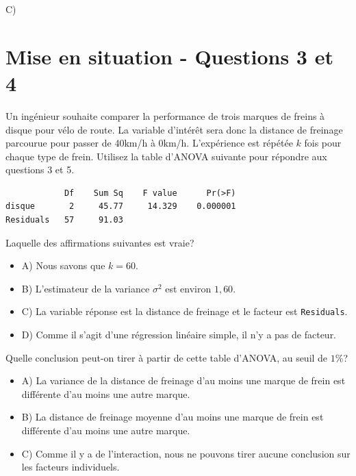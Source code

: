 \begin{questions}
\begin{solution}
C)
\end{solution}


\newpage
\section*{Mise en situation - Questions 3 et 4}
Un ingénieur souhaite comparer la performance de trois marques de freins à disque pour vélo de route. La variable d'intérêt sera donc la distance de freinage parcourue pour passer de 40km/h à 0km/h. L'expérience est répétée $k$ fois pour chaque type de frein. Utilisez la table d'ANOVA suivante pour répondre aux questions 3 et 5.
\begin{verbatim}
            Df    Sum Sq    F value      Pr(>F)    
disque       2     45.77     14.329    0.000001
Residuals   57     91.03      
\end{verbatim}

\question[3] Laquelle des affirmations suivantes est vraie?

\begin{itemize}[label = {}]\setlength{\itemindent}{-2.1em}
\item A) Nous savons que $k=60$.
\item B) L'estimateur de la variance $\sigma^2$ est environ $1,60$.
\item C) La variable réponse est la distance de freinage et le facteur est \texttt{Residuals}.
\item D) Comme il s'agit d'une régression linéaire simple, il n'y a pas de facteur.
\end{itemize}

 

\question[3] Quelle conclusion peut-on tirer à partir de cette table d'ANOVA, au seuil de $1\%$?

\begin{itemize}[label = {}]\setlength{\itemindent}{-2.1em}
\item A) La variance de la distance de freinage d'au moins une marque de frein est différente d'au moins une autre marque.
\item B) La distance de freinage moyenne d'au moins une marque de frein est différente d'au moins une autre marque.
\item C) Comme il y a de l'interaction, nous ne pouvons tirer aucune conclusion sur les facteurs individuels.
\end{itemize}


\end{questions}
